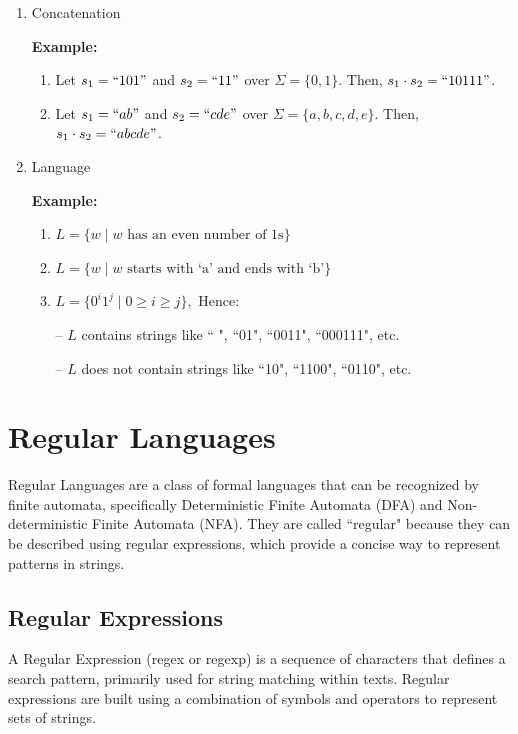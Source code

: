 \documentclass[12pt,a4paper,openany]{article}
\begin{document}
\begin{enumerate}
    \item Concatenation
    
    \textbf{Example:}
    \begin{enumerate}
        \item Let $s_1 = ``101"$ and $s_2 = ``11"$ over $\Sigma = \{0, 1\}$. Then, $s_1 \cdot s_2 = ``10111"$.
        \item Let $s_1 = ``ab"$ and $s_2 = ``cde"$ over $\Sigma = \{a, b, c, d, e\}$. Then, $s_1 \cdot s_2 = ``abcde"$.
    \end{enumerate}

    \item Language
    
    \textbf{Example:}
    \begin{enumerate}
        \item  $L = \{w \mid w \text{ has an even number of 1s}\}$
        \item  $L = \{w \mid w \text{ starts with `a' and ends with `b'}\}$
        \item  $L = \{0^i 1^j \mid 0 \ge i \ge j\},$ Hence:
        
        -- $L$ contains strings like `` ", ``01", ``0011", ``000111", etc.

        -- $L$ does not contain strings like ``10", ``1100", ``0110", etc.
    \end{enumerate}
\end{enumerate}

\section{Regular Languages}

Regular Languages are a class of formal languages that can be recognized by finite automata, specifically Deterministic Finite Automata (DFA) and Non-deterministic Finite Automata (NFA).
They are called ``regular" because they can be described using regular expressions, which provide a concise way to represent patterns in strings.

\subsection{Regular Expressions}

A Regular Expression (regex or regexp) is a sequence of characters that defines a search pattern, primarily used for string matching within texts.
Regular expressions are built using a combination of symbols and operators to represent sets of strings. 
\end{document}
